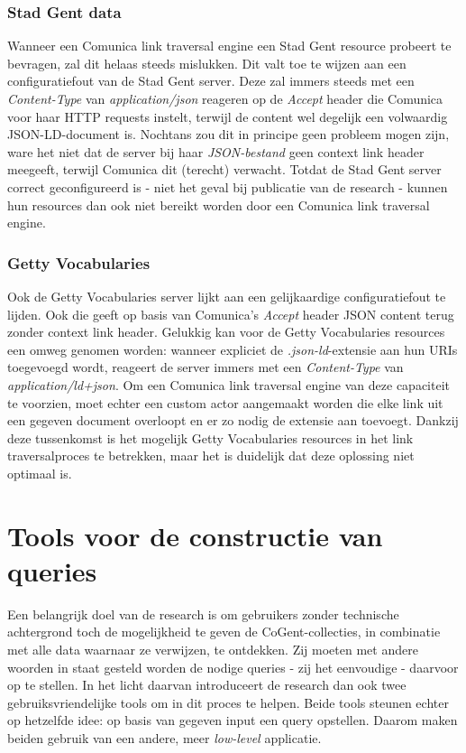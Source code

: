 \documentclass[conference]{IEEEtran}
\begin{document}
\subsubsection{Stad Gent data}
Wanneer een Comunica link traversal engine een Stad Gent resource probeert te bevragen, zal dit helaas steeds mislukken. Dit valt toe te wijzen aan een configuratiefout van de Stad Gent server. Deze zal immers steeds met een \textit{Content-Type} van \textit{application/json} reageren op de \textit{Accept} header die Comunica voor haar HTTP requests instelt, terwijl de content wel degelijk een volwaardig JSON-LD-document is. Nochtans zou dit in principe geen probleem mogen zijn, ware het niet dat de server bij haar \textit{JSON-bestand} geen context link header meegeeft, terwijl Comunica dit (terecht) verwacht. Totdat de Stad Gent server correct geconfigureerd is - niet het geval bij publicatie van de research - kunnen hun resources dan ook niet bereikt worden door een Comunica link traversal engine.

\subsubsection{Getty Vocabularies}
Ook de Getty Vocabularies server lijkt aan een gelijkaardige configuratiefout te lijden. Ook die geeft op basis van Comunica's \textit{Accept} header JSON content terug zonder context link header. Gelukkig kan voor de Getty Vocabularies resources een omweg genomen worden: wanneer expliciet de \textit{.json-ld}-extensie aan hun URIs toegevoegd wordt, reageert de server immers met een \textit{Content-Type} van \textit{application/ld+json}. Om een Comunica link traversal engine van deze capaciteit te voorzien, moet echter een custom actor aangemaakt worden die elke link uit een gegeven document overloopt en er zo nodig de extensie aan toevoegt. Dankzij deze tussenkomst is het mogelijk Getty Vocabularies resources in het link traversalproces te betrekken, maar het is duidelijk dat deze oplossing niet optimaal is.

\section{Tools voor de constructie van queries}
Een belangrijk doel van de research is om gebruikers zonder technische achtergrond toch de mogelijkheid te geven de CoGent-collecties, in combinatie met alle data waarnaar ze verwijzen, te ontdekken. Zij moeten met andere woorden in staat gesteld worden de nodige queries - zij het eenvoudige - daarvoor op te stellen. In het licht daarvan introduceert de research dan ook twee gebruiksvriendelijke tools om in dit proces te helpen. Beide tools steunen echter op hetzelfde idee: op basis van gegeven input een query opstellen. Daarom maken beiden gebruik van een andere, meer \textit{low-level} applicatie.
\end{document}
